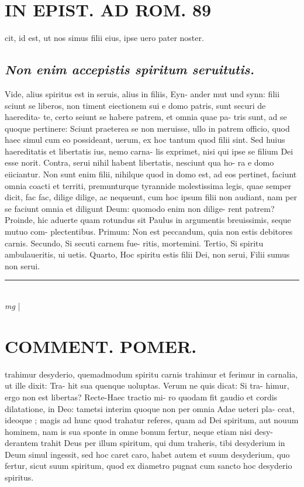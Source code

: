 \documentclass{article}
\begin{document}
\begin{pages}
\section*{IN EPIST. AD ROM.  89 }
\marginpar{[ p.]}\pstart cit, id est, ut nos simus filii eius, ipse uero pater noster.  \pend
{}
{}
\subsection*{\textit{Non enim accepistis spiritum seruitutis. }}\pstart Vide, alius spiritus est in seruis, alius in filiis, Eyn- ander mut und synn: filii sciunt se liberos, non timent eiectionem sui e domo patris, sunt securi de haeredita- te, certo seiunt se habere patrem, et omnia quae pa- tris sunt, ad se quoque pertinere: Sciunt praeterea se non meruisse, ullo in patrem officio, quod haec simul cum eo possideant, uerum, ex hoc tantum quod filii sint. Sed huius haereditatis et libertatis ius, nemo carna- lis exprimet, nisi qui ipse se filium Dei esse norit.  Contra, serui nihil habent libertatis, nesciunt qua ho- ra e domo eiiciantur. Non sunt enim filii, nihilque quod in domo est, ad eos pertinet, faciunt omnia coacti et territi, premunturque tyrannide molestissima legis, quae semper dicit, fac fac, dilige dilige, ac nequeunt, cum hoc ipsum filii non audiant, nam per se faciunt omnia et diligunt Deum: quomodo enim non dilige- rent patrem? Proinde, hic aduerte quam rotundus sit Paulus in argumentis breuissimis, seque mutuo com- plectentibus. Primum: Non est peccandum, quia non estis debitores carnis. Secundo, Si secuti carnem fue- ritis, mortemini. Tertio, Si spiritu ambulaueritis, ui uetis. Quarto, Hoc spiritu estis filii Dei, non serui, Filii sumus non serui.   \pend
\vspace{0.5cm}\noindent
\vspace{0.2cm}\rule{1cm}{0.2pt}\\ 
\hspace{0.2cm}\textit{mg}
\footnotesize 
\normalsize| 
\section*{COMMENT. POMER.  }\pstart trahimur desyderio, quemadmodum spiritu carnis trahimur et ferimur in carnalia, ut ille dixit: Tra- hit sua quenque uoluptas. Verum ne quis dicat: Si tra- himur, ergo non est libertas? Recte-Haec tractio mi- ro quodam fit gaudio et cordis dilatatione, in Deo: tametsi interim quoque non per omnia Adae ueteri pla- ceat, ideoque ; magis ad hunc quod trahatur referes, quam ad Dei spiritum, aut nouum hominem, nam is sua sponte in omne bonum fertur, neque etiam nisi desy- derantem trahit Deus per illum spiritum, qui dum traheris, tibi desyderium in Deum simul ingessit, sed hoc caret caro, habet autem et suum desyderium, quo fertur, sicut suum spiritum, quod ex diametro pugnat cum sancto hoc desyderio spiritus.   \pend
{}
{}

\end{pages}
\end{document}
